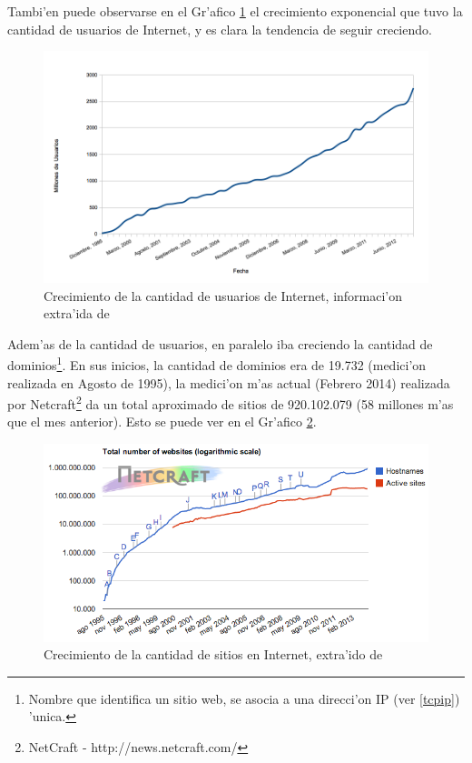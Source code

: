 Tambi'en puede observarse en el Gr'afico \ref{grafCrecInternet} el crecimiento exponencial que tuvo la cantidad de usuarios de Internet, y es clara la tendencia de seguir creciendo.

\begin{figure}[h]
  	\centering
	\includegraphics[width=\textwidth]{img/grafCrecInternet}
	\caption{\small Crecimiento de la cantidad de usuarios de Internet, informaci'on extra'ida de \cite{iws}}
	\label{grafCrecInternet}
\end{figure}

Adem'as de la cantidad de usuarios, en paralelo iba creciendo la cantidad de dominios\footnote{Nombre que identifica un sitio web, se asocia a una direcci'on IP (ver \ref{tcpip}) 'unica.}. En sus inicios, la cantidad de dominios era de 19.732 (medici'on realizada en Agosto de 1995), la medici'on m'as actual (Febrero 2014) realizada por Netcraft\footnote{NetCraft - http://news.netcraft.com/} da un total aproximado de sitios de 920.102.079 \citep{netcraft} (58 millones m'as que el mes anterior). Esto se puede ver en el Gr'afico \ref{grafNetcraft}.

\vspace{2cm}

\begin{figure}[h!]
  	\centering
	\includegraphics[width=\textwidth]{img/grafNetcraft}
	\caption{\small Crecimiento de la cantidad de sitios en Internet, extra'ido de \cite{netcraft}}
	\label{grafNetcraft}
\end{figure}

